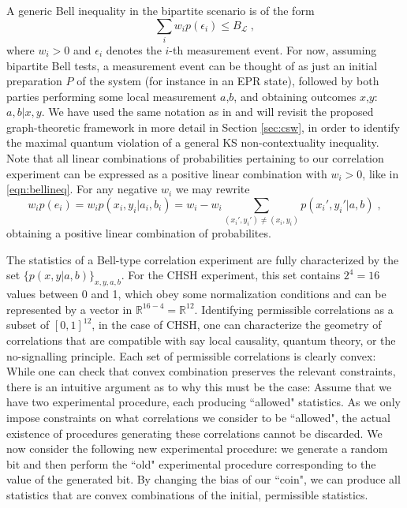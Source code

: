 A generic Bell inequality in the bipartite scenario is of the form
\begin{equation}
\sum_i w_i p(\epsilon_i)\leq B_\mathcal{L}\;,
\label{eqn:bellineq}
\end{equation}
where $w_i>0$ and $\epsilon_i$ denotes the $i$-th measurement event. For now, assuming bipartite Bell tests, a measurement event can be thought of as just an initial preparation $P$ of the system (for instance in an EPR state), followed by both parties performing some local measurement $a$,$b$, and obtaining outcomes $x$,$y$: $a,b \vert x,y$. We have used the same notation as in \cite{Cabello2014} and will revisit the proposed graph-theoretic framework in more detail in Section \ref{sec:csw}, in order to identify the maximal quantum violation of a general KS non-contextuality inequality. Note that all linear combinations of probabilities pertaining to our correlation experiment can be expressed as a positive linear combination with $w_i>0$, like in \ref{eqn:bellineq}. For any negative $w_i$ we may rewrite 
\begin{equation*}
w_i p(e_i)=w_i p(x_i,y_i\vert a_i,b_i)=w_i-w_i\sum\limits_{(x_i',y_i')\neq(x_i,y_i)} p(x_i',y_i' \vert a,b)\;,
\end{equation*} obtaining a positive linear combination of probabilites. 

The statistics of a Bell-type correlation experiment are fully characterized by the set $\{p(x,y\vert a,b)\}_{x,y,a,b}$. For the CHSH experiment, this set contains $2^4=16$ values between 0 and 1, which obey some normalization conditions and can be represented by a vector in $\mathbb{R}^{16-4}=\mathbb{R}^{12}$. Identifying permissible correlations as a subset of $[0,1]^{12}$, in the case of CHSH, one can characterize the geometry of correlations that are compatible with say local causality, quantum theory, or the no-signalling principle. Each set of permissible correlations is clearly convex: While one can check that convex combination preserves the relevant constraints, there is an intuitive argument as to why this must be the case: Assume that we have two experimental procedure, each producing ``allowed" statistics. As we only impose constraints on what correlations we consider to be ``allowed", the actual existence of procedures generating these correlations cannot be discarded. We now consider the following new experimental procedure: we generate a random bit and then perform the ``old" experimental procedure corresponding to the value of the generated bit. By changing the bias of our ``coin", we can produce all statistics that are convex combinations of the initial, permissible statistics.


